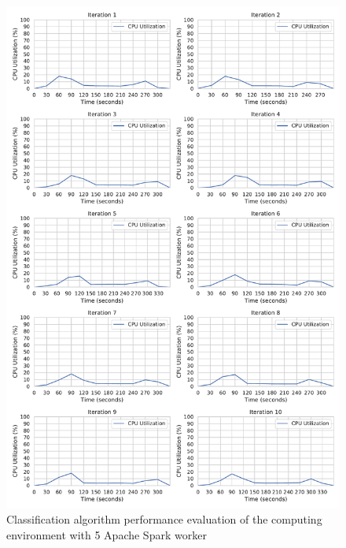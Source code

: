 \begin{figure}[h]
\centering
\includegraphics[scale=0.4]{images/07_evaluation/taxi/taxi_5_worker_cpu_performance}
\caption{Classification algorithm performance evaluation of the computing environment with 5 Apache Spark worker}
\label{fig:07_mortgage_static-cpu_results}
\end{figure}


